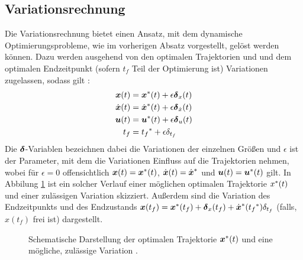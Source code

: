 \subsection{Variationsrechnung}
Die Variationsrechnung bietet einen Ansatz, mit dem dynamische Optimierungsprobleme, wie im vorherigen Absatz vorgestellt, gelöst werden können. Dazu werden ausgehend von den optimalen Trajektorien  und  und dem optimalen Endzeitpunkt  (sofern $t_f$ Teil der Optimierung ist) Variationen zugelassen, sodass gilt \cite{KnutGraichen.2012}:
\begin{align}
\boldsymbol{x}(t) &= {\boldsymbol{x}}^*(t) + \epsilon\boldsymbol{\delta}_{x}(t) \label{eq:x_var}\\
\dot{\boldsymbol{x}}(t) &= {\dot{\boldsymbol{x}}}^*(t) + \epsilon\boldsymbol{\delta}_{\dot{x}}(t) \label{eq:dx_var}\\
\boldsymbol{u}(t) &= {\boldsymbol{u}}^*(t) + \epsilon\boldsymbol{\delta}_{u}(t) \label{eq:u_var}\\
t_f &= {t_f}^* + \epsilon\delta_{t_f}\label{eq:t_var}
\end{align}
Die $\boldsymbol{\delta}$-Variablen bezeichnen dabei die Variationen der einzelnen Größen und $\epsilon$ ist der Parameter, mit dem die Variationen Einfluss auf die Trajektorien nehmen, wobei für $\epsilon=0$ offensichtlich $\boldsymbol{x}(t)={\boldsymbol{x}}^*(t)$, $\dot{\boldsymbol{x}}(t) = {\dot{\boldsymbol{x}}}^*$ und $\boldsymbol{u}(t)={\boldsymbol{u}}^*(t)$ gilt. In Abbilung \ref{fig:Variation} ist ein solcher Verlauf einer möglichen optimalen Trajektorie ${x}^*(t)$ und einer zulässigen Variation skizziert. Außerdem sind die Variation des Endzeitpunkts und des Endzustands $\boldsymbol{x}(t_f) = {\boldsymbol{x}}^*(t_f)+\boldsymbol{\delta}_{x}(t_f)+{\dot{\boldsymbol{x}}}^*({t_f}^*)\delta_{t_f}$ (falls, $x(t_f)$ frei ist) dargestellt.
\begin{figure}[h]
\centering
{}
\caption{Schematische Darstellung der optimalen Trajektorie ${\boldsymbol{x}}^*(t)$ und eine mögliche, zulässige Variation \xoft.}
\label{fig:Variation}
\end{figure}

